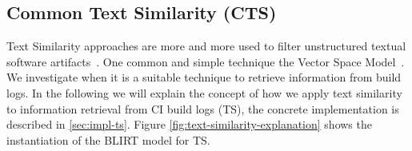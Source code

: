 \documentclass[\myrootdir/main.tex]{subfiles}
\begin{document}


\subsection{Common Text Similarity (CTS)}
\label{sec:expl-ts}

Text Similarity approaches are more and more used to filter unstructured textual software artifacts~\cite{runeson2007detection,marcus2005recovery,antoniol2002recovering,mccarey2006recommending}.
One common and simple technique the Vector Space Model~\cite{schutze2008introduction}.
We investigate when it is a suitable technique to retrieve information from build logs.
In the following we will explain the concept of how we apply text similarity to information retrieval from CI build logs (TS), the concrete implementation is described in \ref{sec:impl-ts}.
Figure \ref{fig:text-similarity-explanation} shows the instantiation of the BLIRT model for TS.
\end{document}
